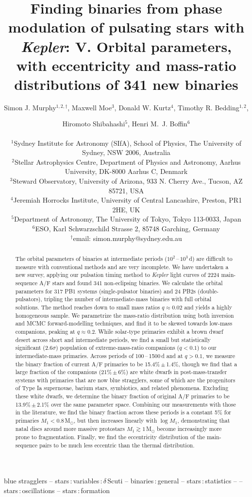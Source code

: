 \documentclass[a4paper,fleqn,usenatbib]{mnras}
\title[{\it Kepler} Pulsating Binaries]{Finding binaries from phase modulation of pulsating stars with {\it Kepler}: V. Orbital parameters, with eccentricity and mass-ratio distributions of 341 new binaries}
\author[S. J. Murphy et al.] 
{Simon J. Murphy$^{1,2,\dagger}$, Maxwell Moe$^{3}$, Donald W. Kurtz$^4$, Timothy R. Bedding$^{1,2}$, \and Hiromoto Shibahashi$^5$, Henri M.~J. Boffin$^{6}$\\
\\
$^1$Sydney Institute for Astronomy (SIfA), School of Physics, The University of Sydney, NSW 2006, Australia\\
$^2$Stellar Astrophysics Centre, Department of Physics and Astronomy, Aarhus University, DK-8000 Aarhus C, Denmark\\
$^3$Steward Observatory, University of Arizona, 933 N. Cherry Ave., Tucson, AZ 85721, USA\\
$^4$Jeremiah Horrocks Institute, University of Central Lancashire, Preston, PR1 2HE, UK\\
$^5$Department of Astronomy, The University of Tokyo, Tokyo 113-0033, Japan\\
$^6$ESO, Karl Schwarzschild Strasse 2, 85748 Garching, Germany\vspace{2mm} \\
$^{\dagger}$email: simon.murphy@sydney.edu.au\\
}
\begin{document}
\maketitle 

\begin{abstract}
The orbital parameters of binaries at intermediate periods ($10^2$\,--\,$10^3$\,d) are difficult to measure with conventional methods and are very incomplete. We have undertaken a new survey, applying our pulsation timing method to \textit{Kepler} light curves of 2224 main-sequence A/F stars and found 341 non-eclipsing binaries. We calculate the orbital parameters for 317 PB1 systems (single-pulsator binaries) and 24 PB2s (double-pulsators), tripling the number of intermediate-mass binaries with full orbital solutions. The method reaches down to small mass ratios $q \approx 0.02$ and yields a highly homogeneous sample. We parametrize the mass-ratio distribution using both inversion and MCMC forward-modelling techniques, and find it to be skewed towards low-mass companions, peaking at $q \approx 0.2$. 
While solar-type primaries exhibit a brown dwarf desert across short and intermediate periods, we find a small but statistically significant (2.6$\sigma$) population of extreme-mass-ratio companions (\mbox{$q < 0.1$}) to our intermediate-mass primaries.
Across periods of 100\,--\,1500\,d and at $q>0.1$, we measure the binary fraction of current A/F primaries to be 15.4\%\,$\pm$\,1.4\%, though we find that a large fraction of the companions (21\%\,$\pm$\,6\%) are white dwarfs in post-mass-transfer systems with primaries that are now blue stragglers, some of which are the progenitors of Type Ia supernovae, barium stars, symbiotics, and related phenomena.
Excluding these white dwarfs, we determine the binary fraction of original A/F primaries to be 13.9\%\,$\pm$\,2.1\% over the same parameter space.
Combining our measurements with those in the literature, we find the binary fraction across these periods is a constant 5\% for primaries $M_1 < 0.8$\,M$_{\odot}$, but then increases linearly with $\log M_1$, demonstrating that natal discs around more massive protostars \mbox{$M_1 \gtrsim 1$\,M$_{\odot}$} become increasingly more prone to fragmentation.
Finally, we find the eccentricity distribution of the main-sequence pairs to be much less eccentric than the thermal distribution.
\end{abstract}

\begin{keywords}
blue stragglers -- stars\,:\,variables\,:\,$\delta$\,Scuti -- binaries\,:\,general -- stars\,:\,statistics --  -- stars\,:\,oscillations -- stars\,:\,formation \vspace{-6mm}
\end{keywords}
\end{document}
